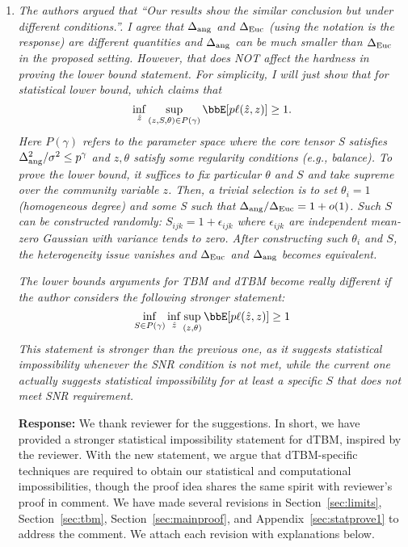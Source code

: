 \documentclass[11pt]{article}
\theoremstyle{definition}
\theoremstyle{definition}
\begin{document}
\begin{enumerate}
    \begin{enumerate}[wide]
        \item \textit{The authors argued that ``Our results show the similar conclusion but under different conditions.”. I agree that $\Delta_{\rm ang}$ and $\Delta_{\rm Euc}$ (using the notation is the response) are different quantities and $\Delta_{\rm ang}$ can be much smaller than $\Delta_{\rm Euc}$ in the proposed setting. However, that does NOT affect the hardness in proving the lower bound statement. For simplicity, I will just show that for statistical lower bound, which claims that}
    \begin{equation}
        \inf_{\hat z} \sup_{(z,S, \theta) \in P(\gamma)} \bbE[p\ell(\hat z, z )] \geq 1.
    \end{equation}
    \textit{Here $P(\gamma)$ refers to the parameter space where the core tensor S satisfies $\Delta_{\rm ang}^2 /\sigma^2 \leq p^{\gamma}$  and $z, \theta$ satisfy some regularity conditions (e.g., balance). To prove the lower bound, it suffices to fix particular $\theta$ and $S$ and take supreme over the community variable $z$. Then, a trivial selection is to set $\theta_i = 1$ (homogeneous degree) and some S such that $\Delta_{\rm ang}/\Delta_{\rm Euc} = 1 + o(1)$. Such $S$ can be constructed randomly: $S_{ijk} = 1 + \epsilon_{ijk}$ where $\epsilon_{ijk}$  are independent mean-zero Gaussian with variance tends to zero. After constructing such $\theta_i$ and $S$, the heterogeneity issue vanishes and $\Delta_{\rm Euc}$ and $\Delta_{\rm ang}$ becomes equivalent.}
    
    \textit{The lower bounds arguments for TBM and dTBM become really different if the author considers the following stronger statement:}
    \begin{equation}
        \inf_{S \in P(\gamma)} \inf_{\hat z} \sup_{(z, \theta)} \bbE[p \ell(\hat z, z)] \geq 1
    \end{equation}
    \textit{This statement is stronger than the previous one, as it suggests statistical impossibility whenever the SNR condition is not met, while the current one actually suggests statistical impossibility for at least a specific $S$ that does not meet SNR requirement.}
    
    \textbf{Response:} 
    We thank reviewer for the suggestions. In short, we have provided a stronger statistical impossibility statement for dTBM, inspired by the reviewer. With the new statement, we argue that dTBM-specific techniques are required to obtain our statistical and computational impossibilities, though the proof idea shares the same spirit with reviewer's proof in comment. We have made several revisions in Section~\ref{sec:limits}, Section~\ref{sec:tbm}, Section~\ref{sec:mainproof}, and Appendix~\ref{sec:statprove1} to address the comment. We attach each revision with explanations below.   
    

\end{enumerate}
\end{enumerate}
\end{document}
